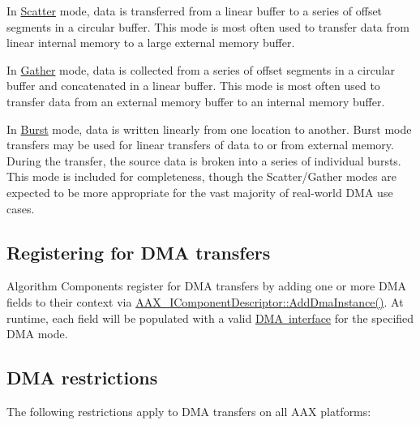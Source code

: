 \begin{DoxyItemize}
\item In \mbox{\hyperlink{a01809_af8d0f19f2896dd6dbd126b919b24e39bac8f3cbed92bc7d135e306cc154ac2ae6}{Scatter}} mode, data is transferred from a linear buffer to a series of offset segments in a circular buffer. This mode is most often used to transfer data from linear internal memory to a large external memory buffer.\end{DoxyItemize}
\begin{DoxyItemize}
\item In \mbox{\hyperlink{a01809_af8d0f19f2896dd6dbd126b919b24e39badec2b76540ba9a168b7a049acb50654d}{Gather}} mode, data is collected from a series of offset segments in a circular buffer and concatenated in a linear buffer. This mode is most often used to transfer data from an external memory buffer to an internal memory buffer.\end{DoxyItemize}
\begin{DoxyItemize}
\item In \mbox{\hyperlink{a01809_af8d0f19f2896dd6dbd126b919b24e39ba253c129077dc004dd83cca8931e69eb9}{Burst}} mode, data is written linearly from one location to another. Burst mode transfers may be used for linear transfers of data to or from external memory. During the transfer, the source data is broken into a series of individual bursts. This mode is included for completeness, though the Scatter/\+Gather modes are expected to be more appropriate for the vast majority of real-\/world D\+MA use cases.\end{DoxyItemize}
\hypertarget{a00810_alg_dma_registration}{}\subsection{Registering for D\+M\+A transfers}\label{a00810_alg_dma_registration}
Algorithm Components register for D\+MA transfers by adding one or more D\+MA fields to their context via \mbox{\hyperlink{a01781_aff9e1c726bbdf500f2d61b164589744e}{A\+A\+X\+\_\+\+I\+Component\+Descriptor\+::\+Add\+Dma\+Instance()}}. At runtime, each field will be populated with a valid \mbox{\hyperlink{a01809}{D\+MA interface}} for the specified D\+MA mode.\hypertarget{a00810_alg_dma_restrictions}{}\subsection{D\+M\+A restrictions}\label{a00810_alg_dma_restrictions}
The following restrictions apply to D\+MA transfers on all A\+AX platforms\+:

